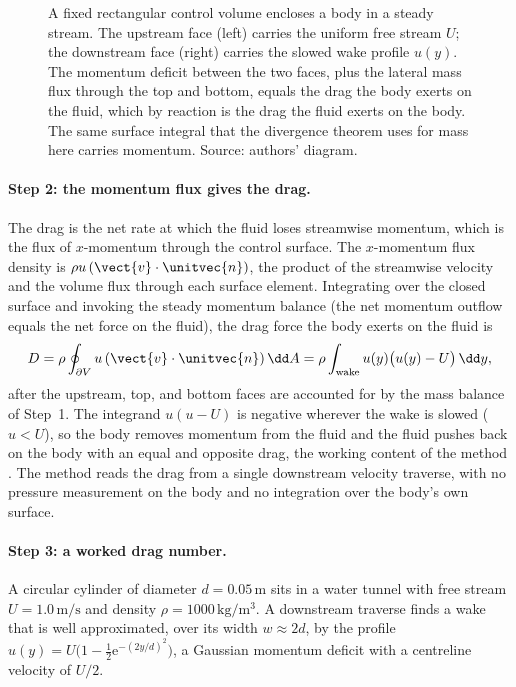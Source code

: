 \begin{figure}[h]
  \centering
  
  \caption[Control volume around a body: momentum-deficit wake.]{A
  fixed rectangular control volume encloses a body in a steady stream.
  The upstream face (left) carries the uniform free stream $U$; the
  downstream face (right) carries the slowed wake profile $u(y)$. The
  momentum deficit between the two faces, plus the lateral mass flux
  through the top and bottom, equals the drag the body exerts on the
  fluid, which by reaction is the drag the fluid exerts on the body.
  The same surface integral that the divergence theorem uses for mass
  here carries momentum. Source: authors' diagram.}
  \label{fig:vol02:ch08:control-volume-drag}
\end{figure}

\paragraph{Step 2: the momentum flux gives the drag.} The drag is the
net rate at which the fluid loses streamwise momentum, which is the
flux of $x$-momentum through the control surface. The $x$-momentum
flux density is $\rho u\,(\vect{v}\cdot\unitvec{n})$, the product of
the streamwise velocity and the volume flux through each surface
element. Integrating over the closed surface and invoking the steady
momentum balance (the net momentum outflow equals the net force on the
fluid), the drag force the body exerts on the fluid is
\[
D = \rho\oint_{\partial V} u\,(\vect{v}\cdot\unitvec{n})\,\dd A =
\rho\int_{\text{wake}} u(y)\big(u(y) - U\big)\,\dd y,
\]
after the upstream, top, and bottom faces are accounted for by the
mass balance of Step~1. The integrand $u(u - U)$ is negative wherever
the wake is slowed ($u < U$), so the body removes momentum from the
fluid and the fluid pushes back on the body with an equal and opposite
drag, the working content of the  method
\cite{text:white-fluid-mechanics}. The method reads the drag from a
single downstream velocity traverse, with no pressure measurement on
the body and no integration over the body's own surface.

\paragraph{Step 3: a worked drag number.} A circular cylinder of
diameter $d = 0.05\,\si{\meter}$ sits in a water tunnel with free
stream $U = 1.0\,\si{\meter\per\second}$ and density $\rho = 1000\,
\si{\kilogram\per\meter\cubed}$. A downstream traverse finds a wake
that is well approximated, over its width $w \approx 2d$, by the
profile $u(y) = U\big(1 - \tfrac{1}{2}\mathrm{e}^{-(2y/d)^{2}}\big)$,
a Gaussian momentum deficit with a centreline velocity of $U/2$.

